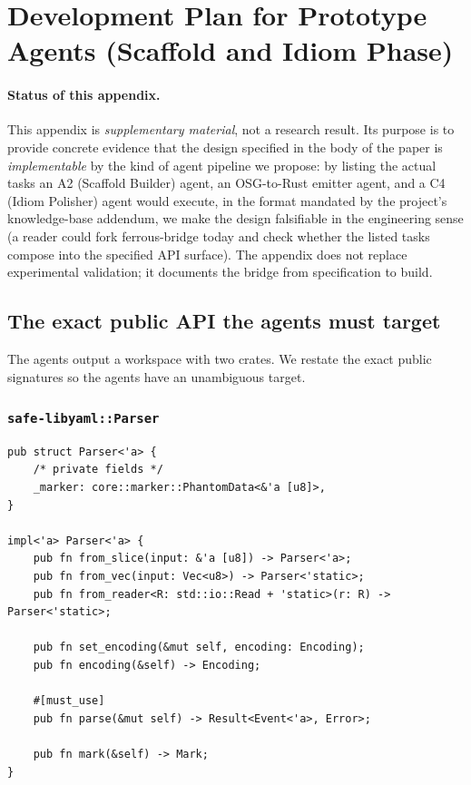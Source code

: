 \documentclass[12pt]{article}
\theoremstyle{definition}
\theoremstyle{remark}
\begin{document}
\newpage
\appendix
\sloppy
\section{Development Plan for Prototype Agents (Scaffold and Idiom Phase)}
\label{app:dev-plan}

\paragraph{Status of this appendix.} This appendix is \emph{supplementary
material}, not a research result. Its purpose is to provide concrete
evidence that the design specified in the body of the paper is
\emph{implementable} by the kind of agent pipeline we propose: by listing
the actual tasks an A2 (Scaffold Builder) agent, an OSG-to-Rust emitter
agent, and a C4 (Idiom Polisher) agent would execute, in the format
mandated by the project's knowledge-base addendum, we make the design
falsifiable in the engineering sense (a reader could fork
ferrous-bridge today and check whether the listed tasks compose into the
specified API surface). The appendix does not replace experimental
validation; it documents the bridge from specification to build.

\subsection{The exact public API the agents must target}

The agents output a workspace with two crates. We restate the exact public
signatures so the agents have an unambiguous target.

\subsubsection{\texttt{safe-libyaml::Parser}}
\begin{lstlisting}
pub struct Parser<'a> {
    /* private fields */
    _marker: core::marker::PhantomData<&'a [u8]>,
}

impl<'a> Parser<'a> {
    pub fn from_slice(input: &'a [u8]) -> Parser<'a>;
    pub fn from_vec(input: Vec<u8>) -> Parser<'static>;
    pub fn from_reader<R: std::io::Read + 'static>(r: R) -> Parser<'static>;

    pub fn set_encoding(&mut self, encoding: Encoding);
    pub fn encoding(&self) -> Encoding;

    #[must_use]
    pub fn parse(&mut self) -> Result<Event<'a>, Error>;

    pub fn mark(&self) -> Mark;
}
\end{lstlisting}
\end{document}
